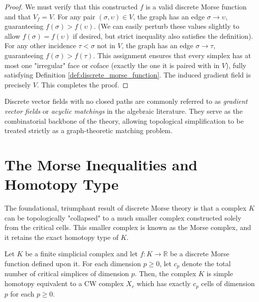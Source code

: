 \begin{proof}
We must verify that this constructed $f$ is a valid discrete Morse function and that $V_f = V$.
For any pair $(\sigma, \upsilon) \in V$, the graph has an edge $\sigma \to \upsilon$, guaranteeing $f(\sigma) > f(\upsilon)$. (We can easily perturb these values slightly to allow $f(\sigma) = f(\upsilon)$ if desired, but strict inequality also satisfies the definition).
For any other incidence $\tau < \sigma$ not in $V$, the graph has an edge $\sigma \to \tau$, guaranteeing $f(\sigma) > f(\tau)$.
This assignment ensures that every simplex has at most one "irregular" face or coface (exactly the one it is paired with in $V$), fully satisfying Definition \ref{def:discrete_morse_function}. The induced gradient field is precisely $V$. This completes the proof.
\end{proof}

Discrete vector fields with no closed paths are commonly referred to as \emph{gradient vector fields} or \emph{acyclic matchings} in the algebraic literature. They serve as the combinatorial backbone of the theory, allowing topological simplification to be treated strictly as a graph-theoretic matching problem.

\section{The Morse Inequalities and Homotopy Type}

The foundational, triumphant result of discrete Morse theory is that a complex $K$ can be topologically "collapsed" to a much smaller complex constructed solely from the critical cells. This smaller complex is known as the Morse complex, and it retains the exact homotopy type of $K$.

\begin{theorem}
\label{thm:fundamental}
Let $K$ be a finite simplicial complex and let $f: K \to \mathbb{R}$ be a discrete Morse function defined upon it. For each dimension $p \ge 0$, let $c_p$ denote the total number of critical simplices of dimension $p$. Then, the complex $K$ is simple homotopy equivalent to a CW complex $X_c$ which has exactly $c_p$ cells of dimension $p$ for each $p \ge 0$.
\end{theorem}


